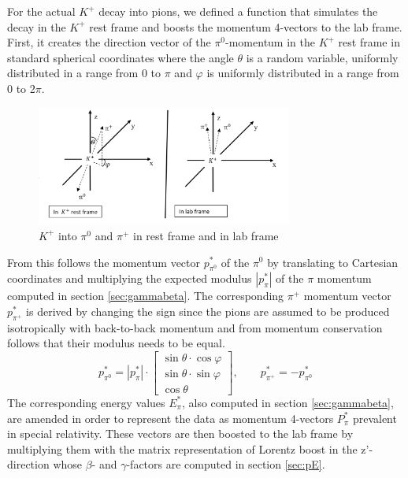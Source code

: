 \documentclass[a4paper,parskip,11pt, DIV12]{scrreprt}
\begin{document}
For the actual $K^+$ decay into pions, we defined a function that simulates the decay in the $K^+$ rest frame and boosts the momentum 4-vectors to the lab frame.
 First, it creates the direction vector of the $\pi^0$-momentum in the $K^+$ rest frame in standard spherical coordinates where the angle $\theta$ is a random variable, uniformly distributed in a range from 0 to $\pi$ and $\varphi$ is uniformly distributed in a range from 0 to 2$\pi$. 
\begin{figure}[htbp] 
\centering
\includegraphics[width=0.75\textwidth]{Frames.png} 
\caption{$K^+$ into $\pi^0$ and $\pi^+$ in rest frame and in lab frame}
\label{fig:2}    
\end{figure}
From this follows the momentum vector $p^*_{\pi^0}$ of the $\pi^0$ by translating to Cartesian coordinates and multiplying the expected modulus $|p^*_{\pi}|$ of the $\pi$ momentum computed in section \ref{sec:gammabeta}. The corresponding $\pi^+$ momentum vector $p^*_{\pi^+}$ is derived by changing the sign since the pions are assumed to be produced isotropically with back-to-back momentum and from momentum conservation follows that their modulus needs to be equal. 
\begin{equation}
p^*_{\pi^0} = |p^*_{\pi}| \cdot \begin{bmatrix}
\sin\theta \cdot \cos\varphi \\ \sin\theta \cdot \sin\varphi \\ \cos\theta
\end{bmatrix}
, \quad \quad p^*_{\pi^+} = -p^*_{\pi^0}
\end{equation}
The corresponding energy values $E^*_{\pi}$, also computed in section \ref{sec:gammabeta}, are amended in order to represent the data as momentum 4-vectors $P^*_{\pi}$  prevalent in special relativity. These vectors are then boosted to the lab frame by multiplying them with the matrix representation of Lorentz boost in the z'-direction whose $\beta$- and $\gamma$-factors are computed in section \ref{sec:pE}.
\end{document}
